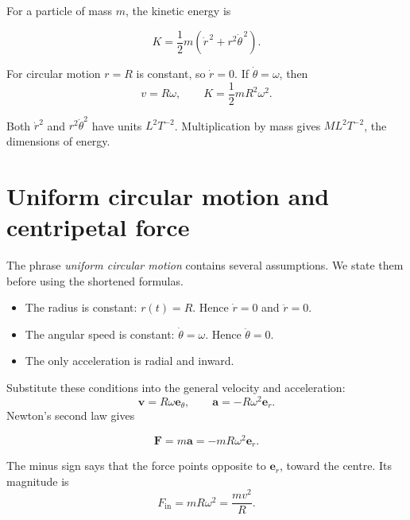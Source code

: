 \documentclass[11pt,a4paper]{article}
\newcommand{\er}{\bm e_r}
\newcommand{\etheta}{\bm e_\theta}
\newcommand{\vv}{\bm v}
\newcommand{\acc}{\bm a}
\newcommand{\FF}{\bm F}
\begin{document}
For a particle of mass $m$, the kinetic energy is
\begin{result}
\[
  \boxed{K=\frac12m\left(\dot r^{\,2}+r^2\dot\theta^{\,2}\right).}
\]
\end{result}

For circular motion $r=R$ is constant, so $\dot r=0$. If $\dot\theta=\omega$, then
\[
  v=R\omega,
  \qquad
  K=\frac12mR^2\omega^2.
\]

\begin{notecheck}
Both $\dot r^2$ and $r^2\dot\theta^2$ have units $L^2T^{-2}$. Multiplication by mass gives $ML^2T^{-2}$, the dimensions of energy.
\end{notecheck}

\clearpage

\section{Uniform circular motion and centripetal force}

The phrase \emph{uniform circular motion} contains several assumptions. We state them before using the shortened formulas.

\begin{itemize}
  \item The radius is constant: $r(t)=R$. Hence $\dot r=0$ and $\ddot r=0$.
  \item The angular speed is constant: $\dot\theta=\omega$. Hence $\ddot\theta=0$.
  \item The only acceleration is radial and inward.
\end{itemize}

Substitute these conditions into the general velocity and acceleration:
\[
  \vv=R\omega\etheta,
  \qquad
  \acc=-R\omega^2\er.
\]
Newton's second law gives
\begin{result}
\[
  \boxed{\FF=m\acc=-mR\omega^2\er.}
\]
\end{result}

The minus sign says that the force points opposite to $\er$, toward the centre. Its magnitude is
\[
  F_{\text{in}}=mR\omega^2=\frac{mv^2}{R}.
\]

\begin{center}
\end{center}
\end{document}
